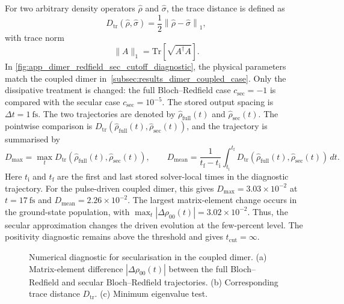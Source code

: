 For two arbitrary density operators \(\hat{\rho}\) and \(\hat{\sigma}\), the
trace distance is defined as
\begin{equation*}
D_{\mathrm{tr}}(\hat{\rho},\hat{\sigma})
=
\frac{1}{2}\left\|\hat{\rho}-\hat{\sigma}\right\|_1,
\end{equation*}
with trace norm
\begin{equation*}
\|A\|_1 = \mathrm{Tr}\!\left[\sqrt{A^{\dagger}A}\right].
\end{equation*}
In \autoref{fig:app_dimer_redfield_sec_cutoff_diagnostic}, the physical
parameters match the coupled dimer
in~\autoref{subsec:results_dimer_coupled_case}. Only the dissipative treatment
is changed: the full Bloch--Redfield case \(c_{\mathrm{sec}}=-1\) is compared
with the secular case \(c_{\mathrm{sec}}=10^{-5}\). The stored output spacing
is \(\Delta t=\SI{1}{\femto\second}\). The two trajectories are denoted by
\(\hat{\rho}_{\mathrm{full}}(t)\) and \(\hat{\rho}_{\mathrm{sec}}(t)\). The
pointwise comparison is
\(D_{\mathrm{tr}}(\hat{\rho}_{\mathrm{full}}(t),\hat{\rho}_{\mathrm{sec}}(t))\),
and the trajectory is summarised by
\begin{equation*}
D_{\max}
=
\max_t D_{\mathrm{tr}}(\hat{\rho}_{\mathrm{full}}(t),\hat{\rho}_{\mathrm{sec}}(t)),
\qquad
D_{\mathrm{mean}} =
\frac{1}{t_{\mathrm{f}}-t_{\mathrm{i}}}\int_{t_{\mathrm{i}}}^{t_{\mathrm{f}}}
D_{\mathrm{tr}}(\hat{\rho}_{\mathrm{full}}(t),\hat{\rho}_{\mathrm{sec}}(t))\,dt.
\end{equation*}
Here \(t_{\mathrm{i}}\) and \(t_{\mathrm{f}}\) are the first and last stored
solver-local times in the diagnostic trajectory.
For the pulse-driven coupled dimer, this gives \(D_{\max}=3.03\times10^{-2}\) at \(t=\SI{17}{\femto\second}\) and \(D_{\mathrm{mean}}=2.26\times10^{-2}\). The largest matrix-element change occurs in the ground-state population, with \(\max_t |\Delta\rho_{00}(t)| = 3.02\times10^{-2}\). Thus, the secular approximation changes the driven evolution at the few-percent level. The positivity diagnostic remains above the threshold and gives \(t_{\mathrm{cut}}=\infty\).

\begin{figure}[htbp]
    \centering
    \caption{Numerical diagnostic for secularisation in the coupled dimer. (a) Matrix-element difference \(|\Delta\rho_{00}(t)|\) between the full Bloch--Redfield and secular Bloch--Redfield trajectories. (b) Corresponding trace distance \(D_{\mathrm{tr}}\). (c) Minimum eigenvalue test.}
    \label{fig:app_dimer_redfield_sec_cutoff_diagnostic}
\end{figure}

